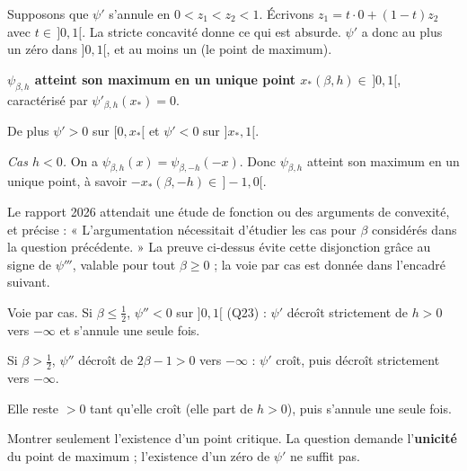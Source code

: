 \documentclass[11pt,a4paper]{article}
\newcommand{\equationajustee}[1]{%
  \sbox{\boiteequation}{$\displaystyle #1$}%
  \ifdim\wd\boiteequation>\linewidth
    \[\resizebox{\linewidth}{!}{\usebox{\boiteequation}}\]%
  \else
    \[#1\]%
  \fi}
\begin{document}
Supposons que \(\psi'\) s'annule en \(0<z_1<z_2<1\). Écrivons \(z_1=t\cdot0+(1-t)z_2\) avec \(t\in\,]0,1[\). La stricte concavité donne
\equationajustee{\begin{aligned}
0=\psi'(z_1)&>t\,\psi'(0)+(1-t)\,\psi'(z_2)\\
&=th>0,
\end{aligned}}
ce qui est absurde. \(\psi'\) a donc au plus un zéro dans \(]0,1[\), et au moins un (le point de maximum).

\textbf{\(\psi_{\beta,h}\) atteint son maximum en un unique point \(x_*(\beta,h)\in\,]0,1[\)}, caractérisé par \(\psi'_{\beta,h}(x_*)=0\).

De plus \(\psi'>0\) sur \([0,x_*[\) et \(\psi'<0\) sur \(]x_*,1[\).

\emph{Cas \(h<0\).} On a \(\psi_{\beta,h}(x)=\psi_{\beta,-h}(-x)\). Donc \(\psi_{\beta,h}\) atteint son maximum en un unique point, à savoir \(-x_*(\beta,-h)\in\,]-1,0[\).

\begin{jury}

Le rapport 2026 attendait une étude de fonction ou des arguments de convexité, et précise : « L'argumentation nécessitait d'étudier les cas pour \(\beta\) considérés dans la question précédente. » La preuve ci-dessus évite cette disjonction grâce au signe de \(\psi'''\), valable pour tout \(\beta\geqslant0\) ; la voie par cas est donnée dans l'encadré suivant.

\end{jury}

\begin{methode}

Voie par cas. Si \(\beta\leqslant\frac12\), \(\psi''<0\) sur \(]0,1[\) (Q23) : \(\psi'\) décroît strictement de \(h>0\) vers \(-\infty\) et s'annule une seule fois.

Si \(\beta>\frac12\), \(\psi''\) décroît de \(2\beta-1>0\) vers \(-\infty\) : \(\psi'\) croît, puis décroît strictement vers \(-\infty\).

Elle reste \(>0\) tant qu'elle croît (elle part de \(h>0\)), puis s'annule une seule fois.

\end{methode}

\begin{piege}

Montrer seulement l'existence d'un point critique. La question demande l'\textbf{unicité} du point de maximum ; l'existence d'un zéro de \(\psi'\) ne suffit pas.

\end{piege}
\end{document}
